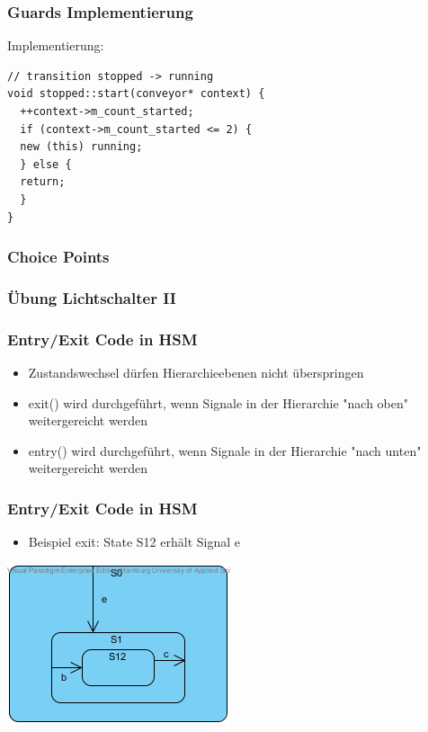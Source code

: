 \documentclass{beamer}
\begin{document}
\begin{frame}[fragile]
 \frametitle{Guards Implementierung}
 Implementierung:
  \begin{lstlisting}
// transition stopped -> running
void stopped::start(conveyor* context) {
  ++context->m_count_started;
  if (context->m_count_started <= 2) {
  new (this) running;
  } else {
  return;
  }
}
  \end{lstlisting}
\end{frame}

\begin{frame}
 \frametitle{Choice Points}
\end{frame}

\begin{frame}
 \frametitle{\"Ubung Lichtschalter II}
\end{frame}

\begin{frame}
  \frametitle{Entry/Exit Code in HSM }
  \begin{itemize}
  \item Zustandswechsel d\"urfen Hierarchieebenen nicht \"uberspringen
  \item exit() wird durchgef\"uhrt, wenn Signale in der Hierarchie "nach oben" weitergereicht werden
  \item entry() wird  durchgef\"uhrt, wenn Signale in der Hierarchie "nach unten" weitergereicht werden
  \end{itemize}
\end{frame}

\begin{frame}
  \frametitle{Entry/Exit Code in HSM }
  \begin{itemize}
  \item Beispiel exit: State S12 erh\"alt Signal e
  \end{itemize}
  \includegraphics[scale=.6]{img/beispiel_exitSM}
\end{frame}
\end{document}
